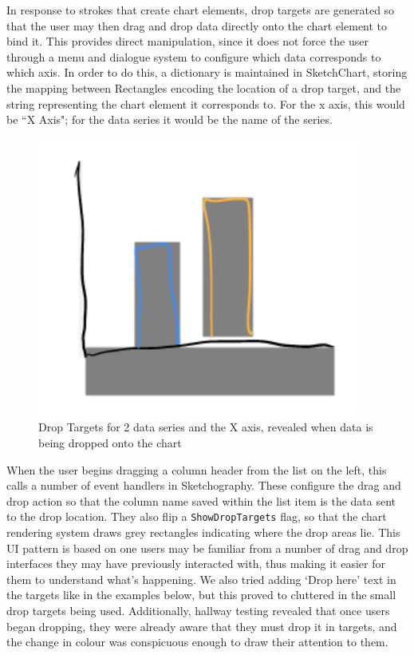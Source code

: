 	
	In response to strokes that create chart elements, drop targets are generated so that the user may then drag and drop data directly onto the chart element to bind it. This provides direct manipulation, since it does not force the user through a menu and dialogue system to configure which data corresponds to which axis. In order to do this, a dictionary is maintained in SketchChart, storing the mapping between Rectangles encoding the location of a drop target, and the string representing the chart element it corresponds to. For the x axis, this would be ``X Axis"; for the data series it would be the name of the series. 

	\begin{figure}[H]
	\centering
	\includegraphics[scale=1]{droptargets}
	\caption{Drop Targets for 2 data series and the X axis, revealed when data is being dropped onto the chart}
	\end{figure}
	

	When the user begins dragging a column header from the list on the left, this calls a number of event handlers in Sketchography. These configure the drag and drop action so that the column name saved within the list item is the data sent to the drop location. They also flip a \texttt{ShowDropTargets} flag, so that the chart rendering system draws grey rectangles indicating where the drop areas lie. This UI pattern is based on one users may be familiar from a number of drag and drop interfaces they may have previously interacted with, thus making it easier for them to understand what's happening. We also tried adding `Drop here' text in the targets like in the examples below, but this proved to cluttered in the small drop targets being used. Additionally, hallway testing revealed that once users began dropping, they were already aware that they must drop it in targets, and the change in colour was conspicuous enough to draw their attention to them.
	
